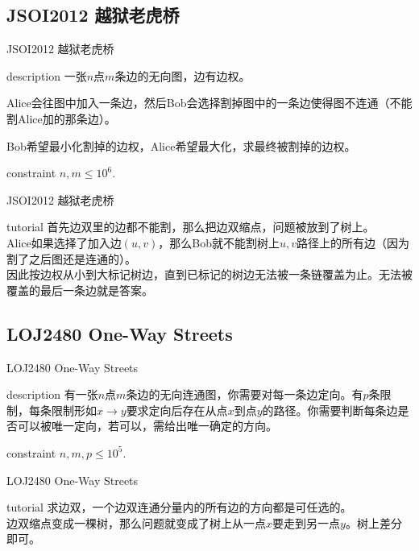 \documentclass{beamer}
\begin{document}
\subsection{JSOI2012 越狱老虎桥}
\begin{frame}{JSOI2012 越狱老虎桥}
	\begin{block}{description}
		一张$n$点$m$条边的无向图，边有边权。
		
		Alice会往图中加入一条边，然后Bob会选择割掉图中的一条边使得图不连通（不能割Alice加的那条边）。
		
		Bob希望最小化割掉的边权，Alice希望最大化，求最终被割掉的边权。
	\end{block}
	\begin{block}{constraint}
		$n, m \le 10^6.$
	\end{block}
\end{frame}
\begin{frame}{JSOI2012 越狱老虎桥}
	\begin{block}{tutorial}
		首先边双里的边都不能割，那么把边双缩点，问题被放到了树上。\\
		
		Alice如果选择了加入边$(u, v)$，那么Bob就不能割树上$u, v$路径上的所有边（因为割了之后图还是连通的）。\\
		
		因此按边权从小到大标记树边，直到已标记的树边无法被一条链覆盖为止。无法被覆盖的最后一条边就是答案。
	\end{block}
\end{frame}

\subsection{LOJ2480 One-Way Streets}
\begin{frame}{LOJ2480 One-Way Streets}
	\begin{block}{description}
		有一张$n$点$m$条边的无向连通图，你需要对每一条边定向。有$p$条限制，每条限制形如$x\to y$要求定向后存在从点$x$到点$y$的路径。你需要判断每条边是否可以被唯一定向，若可以，需给出唯一确定的方向。
	\end{block}
	\begin{block}{constraint}
		$n, m, p \le 10^5.$
	\end{block}
\end{frame}
\begin{frame}{LOJ2480 One-Way Streets}
	\begin{block}{tutorial}
		求边双，一个边双连通分量内的所有边的方向都是可任选的。\\
		
		边双缩点变成一棵树，那么问题就变成了树上从一点$x$要走到另一点$y$。树上差分即可。
	\end{block}
\end{frame}
\end{document}
